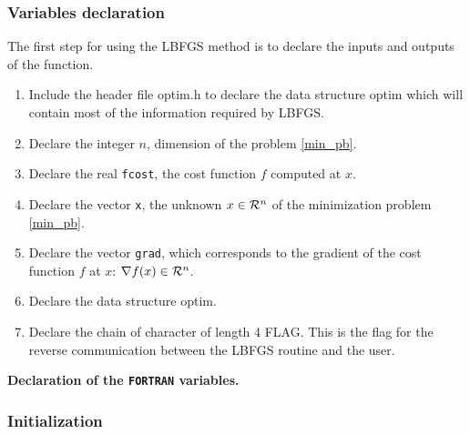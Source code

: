 \documentclass[a4paper,twoside,final,onecolumn,11pt,openright]{article}
\def \mathbb #1{{\cal #1}}
\begin{document}
\subsubsection{Variables declaration}
The first step for using the LBFGS method is to declare the inputs and outputs of the function. 
\begin{enumerate}
 \item Include the header file optim.h to declare the data structure optim which will contain most of the information required by LBFGS.
 \item Declare the integer $n$, dimension of the problem \eqref{min_pb}.
 \item Declare the real \texttt{fcost}, the cost function $f$ computed at $x$.
 \item Declare the vector \texttt{x}, the unknown $x \in \mathbb{R}^{n}$ of the minimization problem \eqref{min_pb}.
 \item Declare the vector \texttt{grad}, which corresponds to the gradient of the cost function $f$ at $x$: $\nabla f(x) \in \mathbb{R}^{n}$.
 \item Declare the data structure optim.
 \item Declare the chain of character of length 4 FLAG. This is the flag for the reverse communication between the LBFGS routine and the user.
\end{enumerate}

\framebox{
\small
 
} 
\normalsize
\begin{center}
\textbf{Declaration of the \texttt{FORTRAN} variables.} 
\end{center}

\subsubsection{Initialization}
\end{document}
